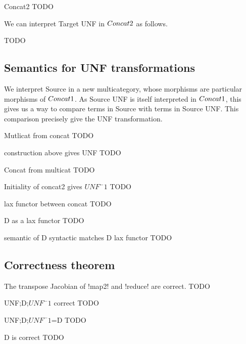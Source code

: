 \begin{example}{Concat2}
    TODO
\end{example}

We can interpret Target UNF in $Concat2$ as follows.

TODO

\subsection{Semantics for UNF transformations} %
\label{sub:Semantics for UNF transformations}

We interpret Source in a new multicategory, 
whose morphisms are particular morphisms of $Concat1$.
As Source UNF is itself interpreted in $Concat1$, 
this gives us a way to compare terms in Source with terms in Source UNF.
This comparison precisely give the UNF transformation.

\begin{definition}{Mutlicat from concat}
    TODO
\end{definition}

\begin{proposition}{construction above gives UNF}
    TODO
\end{proposition}




\begin{definition}{Concat from multicat}
    TODO
\end{definition}

\begin{proposition}{Initiality of concat2 gives $UNF^-1$}
    TODO
\end{proposition}






\begin{definition}{lax functor between concat}
    TODO
\end{definition}


\begin{example}{D as a lax functor}
    TODO
\end{example}

\begin{proposition}{semantic of D syntactic matches D lax functor}
    TODO
\end{proposition}


\subsection{Correctness theorem} %
\label{sub:Correctness theorem}

\begin{proposition}{The transpose Jacobian of !map2! and !reduce! are correct.}
    TODO
\end{proposition}

\begin{theorem}{UNF;D;$UNF^-1$ correct}
    TODO
\end{theorem}

\begin{proposition}{UNF;D;$UNF^-1$=D}
    TODO
\end{proposition}

\begin{theorem}{D is correct}
    TODO
\end{theorem}